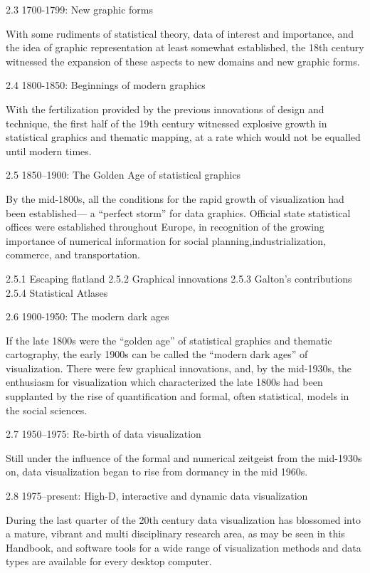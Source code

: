 \documentclass[]{book}
\theoremstyle{definition}
\theoremstyle{definition}
\theoremstyle{definition}
\theoremstyle{remark}
\begin{document}
2.3 1700-1799: New graphic forms

With some rudiments of statistical theory, data of interest and
importance, and the idea of graphic representation at least somewhat
established, the 18th century witnessed the expansion of these aspects
to new domains and new graphic forms.

2.4 1800-1850: Beginnings of modern graphics

With the fertilization provided by the previous innovations of design
and technique, the first half of the 19th century witnessed explosive
growth in statistical graphics and thematic mapping, at a rate which
would not be equalled until modern times.

2.5 1850--1900: The Golden Age of statistical graphics

By the mid-1800s, all the conditions for the rapid growth of
visualization had been established--- a ``perfect storm'' for data
graphics. Official state statistical offices were established throughout
Europe, in recognition of the growing importance of numerical
information for social planning,industrialization, commerce, and
transportation.

2.5.1 Escaping flatland 2.5.2 Graphical innovations 2.5.3 Galton's
contributions 2.5.4 Statistical Atlases

2.6 1900-1950: The modern dark ages

If the late 1800s were the ``golden age'' of statistical graphics and
thematic cartography, the early 1900s can be called the ``modern dark
ages'' of visualization. There were few graphical innovations, and, by
the mid-1930s, the enthusiasm for visualization which characterized the
late 1800s had been supplanted by the rise of quantification and formal,
often statistical, models in the social sciences.

2.7 1950--1975: Re-birth of data visualization

Still under the influence of the formal and numerical zeitgeist from the
mid-1930s on, data visualization began to rise from dormancy in the mid
1960s.

2.8 1975--present: High-D, interactive and dynamic data visualization

During the last quarter of the 20th century data visualization has
blossomed into a mature, vibrant and multi disciplinary research area,
as may be seen in this Handbook, and software tools for a wide range of
visualization methods and data types are available for every desktop
computer.
\end{document}
